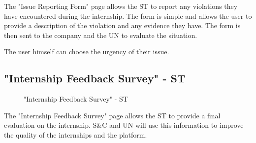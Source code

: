 \par The "Issue Reporting Form" page allows the ST to report any violations they have encountered during the
internship. The form is simple and allows the user to provide a description of the violation and any evidence they
have. The form is then sent to the company and the UN to evaluate the situation.

\par The user himself can choose the urgency of their issue.

\subsection{"Internship Feedback Survey" - ST}
\label{subsec:internship-feedback-survey-st}%

\begin{figure}[H]
    \centering
    \caption{"Internship Feedback Survey" - ST}
    \label{fig:internship-feedback-survey-st}
\end{figure}

\par The "Internship Feedback Survey" page allows the ST to provide a final evaluation on the internship. S\&C and UN
will use this information to improve the quality of the internships and the platform.
